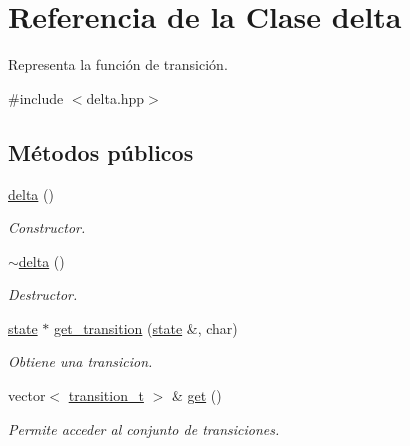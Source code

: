 \hypertarget{classdelta}{}\section{Referencia de la Clase delta}
\label{classdelta}


Representa la función de transición.  




{\ttfamily \#include $<$delta.\+hpp$>$}

\subsection*{Métodos públicos}
\begin{DoxyCompactItemize}
\item 
\hypertarget{classdelta_a435f658a4e7efcf415b8b5c0c719ebc2}{}\hyperlink{classdelta_a435f658a4e7efcf415b8b5c0c719ebc2}{delta} ()\label{classdelta_a435f658a4e7efcf415b8b5c0c719ebc2}

\begin{DoxyCompactList}\small\item\em Constructor. \end{DoxyCompactList}\item 
\hypertarget{classdelta_ae8501f76d2bd17cce5a65b89b82a6ed0}{}\hyperlink{classdelta_ae8501f76d2bd17cce5a65b89b82a6ed0}{$\sim$delta} ()\label{classdelta_ae8501f76d2bd17cce5a65b89b82a6ed0}

\begin{DoxyCompactList}\small\item\em Destructor. \end{DoxyCompactList}\item 
\hyperlink{classstate}{state} $\ast$ \hyperlink{classdelta_aa359c89a3337fd319b02866a4e0c32ce}{get\+\_\+transition} (\hyperlink{classstate}{state} \&, char)
\begin{DoxyCompactList}\small\item\em Obtiene una transicion. \end{DoxyCompactList}\item 
vector$<$ \hyperlink{classtransition__t}{transition\+\_\+t} $>$ \& \hyperlink{classdelta_ad6da0f0ae180e4315634dd9bf06aecc6}{get} ()
\begin{DoxyCompactList}\small\item\em Permite acceder al conjunto de transiciones. \end{DoxyCompactList}\end{DoxyCompactItemize}
